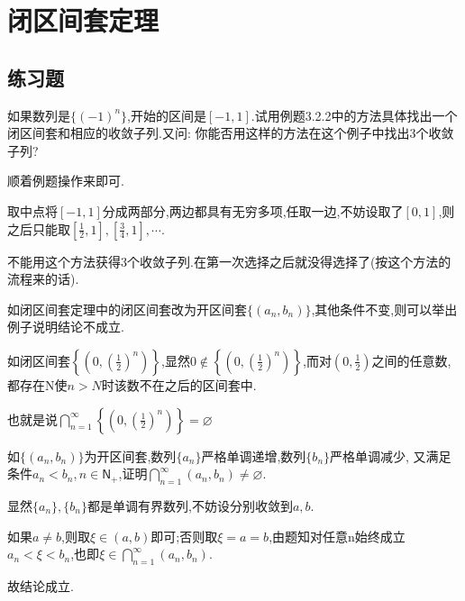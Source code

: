 \documentclass[cn,chinese,fontset]{elegantbook}
\begin{document}
 \section{闭区间套定理}
  \subsection{练习题}
      \begin{exercise}
          如果数列是$\{(-1)^n\}$,开始的区间是$[-1,1]$.试用例题3.2.2中的方法具体找出一个闭区间套和相应的收敛子列.又问: 你能否用这样的方法在这个例子中找出3个收敛子列?
      \end{exercise}
      \begin{solution}
          顺着例题操作来即可.

          取中点将$[-1,1]$分成两部分,两边都具有无穷多项,任取一边,不妨设取了$[0,1]$,则之后只能取$[\frac{1}{2},1],[\frac{3}{4},1],\cdots$.

          不能用这个方法获得3个收敛子列.在第一次选择之后就没得选择了(按这个方法的流程来的话).
      \end{solution}

      \begin{exercise}
          如闭区间套定理中的闭区间套改为开区间套$\{(a_n,b_n)\}$,其他条件不变,则可以举出例子说明结论不成立.
      \end{exercise}
      \begin{solution}
          如闭区间套$\left\{(0,(\frac{1}{2})^n)\right\}$,显然$0\notin\left\{(0,(\frac{1}{2})^n)\right\}$,而对$(0,\frac{1}{2})$之间的任意数,都存在N使$n>N$时该数不在之后的区间套中.

          也就是说$\textstyle\bigcap_{n=1}^\infty\left\{(0,(\frac{1}{2})^n)\right\}=\varnothing $
      \end{solution}

      \begin{exercise}
          如$\{(a_n,b_n)\}$为开区间套,数列$\{a_n\}$严格单调递增,数列$\{b_n\}$严格单调减少,
          又满足条件$a_n<b_n,n\in \mathsf{N}_+$,证明$\textstyle\bigcap_{n=1}^\infty(a_n,b_n)\neq\varnothing$.
      \end{exercise}
      \begin{solution}
          显然$\{a_n\},\{b_n\}$都是单调有界数列,不妨设分别收敛到$a,b$.

          如果$a\neq b$,则取$\xi \in (a,b)$即可;否则取$\xi=a=b$,由题知对任意n始终成立$a_n<\xi<b_n$,也即$\xi\in\textstyle\bigcap_{n=1}^\infty(a_n,b_n)$.

          故结论成立.
      \end{solution}
\end{document}
